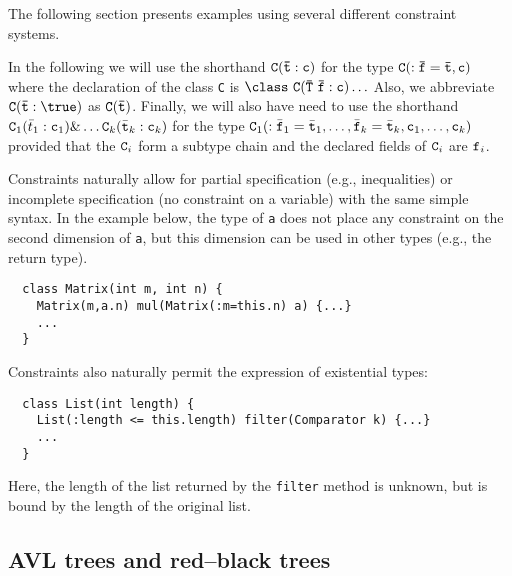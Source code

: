 %
%
%
%
%
%

The following section presents examples using several different
constraint systems.

In the following we will use the shorthand $\tt C(\bar{t}:c)$ for the
type $\tt C(:\bar{f}=\bar{t},c)$ where the declaration of the class
{\tt C} is $\tt \class\ C(\bar{\tt T}\ \bar{\tt f}:c)\ldots$  Also,
we abbreviate $\tt C(\bar{t}:\true)$ as $\tt C(\bar{t})$.  Finally, we
will also have need to use the shorthand
${\tt C}_1(\bar{t}_1:{\tt c}_1)\& \ldots {\tt C}_k(\bar{\tt t}_k:{\tt c}_k)$
for the type
${\tt C}_1(:\bar{\tt f}_1=\bar{\tt t}_1, \ldots,
            \bar{\tt f}_k=\bar{\tt t}_k,{\tt c}_1,\ldots,{\tt c}_k)$ 
provided that the ${\tt C}_i$ form a subtype chain
and the declared fields of ${\tt C}_i$ are ${\tt f}_i$.

Constraints naturally allow for partial specification
(e.g., inequalities) or incomplete specification (no constraint on a
variable) with the same simple syntax. In the example below,
the type of {\tt a} does not place any constraint on the second
dimension of {\tt a}, but this dimension can be used in other
types (e.g., the return type).
{\footnotesize
\begin{verbatim}
  class Matrix(int m, int n) {
    Matrix(m,a.n) mul(Matrix(:m=this.n) a) {...}
    ...
  }
\end{verbatim}}

Constraints also naturally permit the expression of existential types:
{\footnotesize
\begin{verbatim}
  class List(int length) { 
    List(:length <= this.length) filter(Comparator k) {...} 
    ...
  }
\end{verbatim}}
\noindent
Here, the length of the list returned by the {\tt filter} method is 
unknown, but is bound by the length of the original list.

\subsection{AVL trees and red--black trees}

